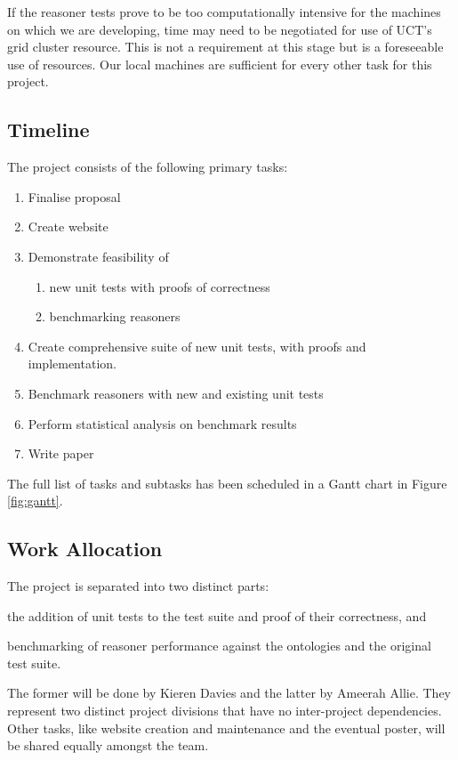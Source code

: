 \documentclass[draft]{sig-alternate}
\newcommand{\todo}[1][]{\ifdraft{\ifthenelse{\isempty{#1}}{\hl{(TODO)}}{\hl{(TODO: #1)}}}{}}
\begin{document}
If the reasoner tests prove to be too computationally intensive for the machines on which we are developing, time may need to be negotiated for use of UCT's grid cluster resource. This is not a requirement at this stage but is a foreseeable use of resources. Our local machines are sufficient for every other task for this project.

\subsection{Timeline}

The project consists of the following primary tasks:
\begin{enumerate}[noitemsep]
  \item Finalise proposal
  \item Create website
  \item Demonstrate feasibility of
  \begin{enumerate}[nosep]
    \item new unit tests with proofs of correctness
    \item benchmarking reasoners
  \end{enumerate}
  \item Create comprehensive suite of new unit tests, with proofs and implementation.
  \item Benchmark reasoners with new and existing unit tests
  \item Perform statistical analysis on benchmark results
  \item Write paper
\end{enumerate}
\todo[repetition]
The full list of tasks and subtasks has been scheduled in a Gantt chart in Figure \ref{fig:gantt}.

\begin{sidewaysfigure*}
  \caption{Timeline Gantt chart}
  \label{fig:gantt}
  \vspace{6pt}
  \hspace{-1.5cm}
  
\end{sidewaysfigure*}

\subsection{Work Allocation}

The project is separated into two distinct parts:
\begin{enumerate*}[label=(\arabic*)]
  \item the addition of unit tests to the test suite and proof of their correctness, and
  \item benchmarking of reasoner performance against the ontologies and the original test suite.
\end{enumerate*}
The former will be done by Kieren Davies and the latter by Ameerah Allie. They represent two distinct project divisions that have no inter-project dependencies. Other tasks, like website creation and maintenance and the eventual poster, will be shared equally amongst the team.
\end{document}

